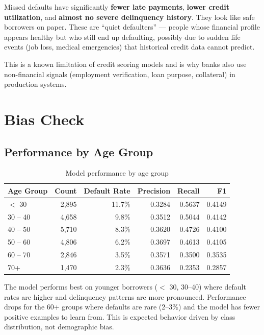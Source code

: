 \documentclass[12pt, a4paper]{article}
\begin{document}
Missed defaults have significantly \textbf{fewer late payments}, \textbf{lower credit utilization}, and \textbf{almost no severe delinquency history}. They look like safe borrowers on paper. These are ``quiet defaulters'' --- people whose financial profile appears healthy but who still end up defaulting, possibly due to sudden life events (job loss, medical emergencies) that historical credit data cannot predict.

This is a known limitation of credit scoring models and is why banks also use non-financial signals (employment verification, loan purpose, collateral) in production systems.

\newpage

\section{Bias Check}

\subsection{Performance by Age Group}

\begin{table}[H]
\centering
\begin{tabular}{lrrrrr}
\toprule
\textbf{Age Group} & \textbf{Count} & \textbf{Default Rate} & \textbf{Precision} & \textbf{Recall} & \textbf{F1} \\
\midrule
$<$ 30 & 2,895 & 11.7\% & 0.3284 & 0.5637 & 0.4149 \\
30 -- 40 & 4,658 & 9.8\% & 0.3512 & 0.5044 & 0.4142 \\
40 -- 50 & 5,710 & 8.3\% & 0.3620 & 0.4726 & 0.4100 \\
50 -- 60 & 4,806 & 6.2\% & 0.3697 & 0.4613 & 0.4105 \\
60 -- 70 & 2,846 & 3.5\% & 0.3571 & 0.3500 & 0.3535 \\
70+ & 1,470 & 2.3\% & 0.3636 & 0.2353 & 0.2857 \\
\bottomrule
\end{tabular}
\caption{Model performance by age group}
\end{table}

The model performs best on younger borrowers ($<$ 30, 30--40) where default rates are higher and delinquency patterns are more pronounced. Performance drops for the 60+ groups where defaults are rare (2--3\%) and the model has fewer positive examples to learn from. This is expected behavior driven by class distribution, not demographic bias.
\end{document}
